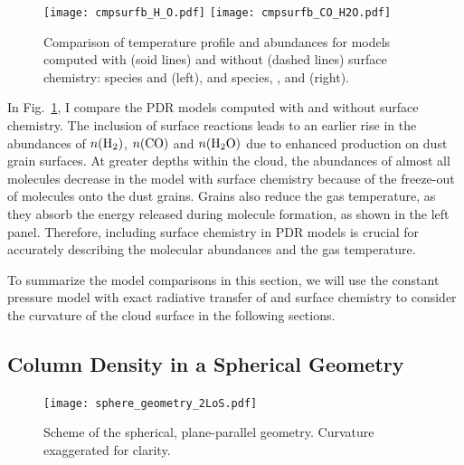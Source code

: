 \documentclass[12pt,a4paper]{article}
\newcommand{\mdpdr}{\texttt{MeudonPDR} code}
\begin{document}
\begin{figure}[h]
    \centering
    \texttt{[image: cmpsurfb\_H\_O.pdf]}
    \texttt{[image: cmpsurfb\_CO\_H2O.pdf]}
    \caption{Comparison of temperature profile and abundances for models computed with (soid lines) and without (dashed lines) surface chemistry:  species and  (left), and  species, , and  (right).} \label{fig:cmpsurfb}
\end{figure}

In Fig.~\ref{fig:cmpsurfb}, I compare the PDR models computed with and without surface chemistry. The inclusion of surface reactions leads to an earlier rise in the abundances of $n(\ce{H2})$, $n(\ce{CO})$ and $n(\ce{H2O})$ due to enhanced production on dust grain surfaces. At greater depths within the cloud, the abundances of almost all molecules decrease in the model with surface chemistry because of the freeze-out of molecules onto the dust grains. Grains also reduce the gas temperature, as they absorb the energy released during molecule formation, as shown in the left panel. Therefore, including surface chemistry in PDR models is crucial for accurately describing the molecular abundances and the gas temperature.

To summarize the model comparisons in this section, we will use the constant pressure model with exact radiative transfer of  and surface chemistry to consider the curvature of the cloud surface in the following sections.

\subsection{Column Density in a Spherical Geometry}
\begin{figure}
    \centering
    \texttt{[image: sphere\_geometry\_2LoS.pdf]}
    \caption{Scheme of the spherical, plane-parallel geometry. Curvature exaggerated for clarity.} \label{fig:geometry}
\end{figure}

\end{document}
